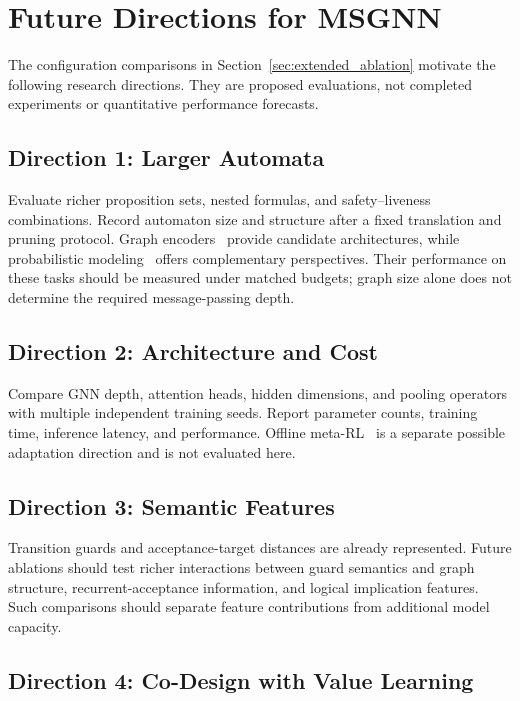 \documentclass[journal]{IEEEtran}
\begin{document}
\section{Future Directions for MSGNN}
\label{app:future_directions}

The configuration comparisons in Section~\ref{sec:extended_ablation} motivate the following research directions. They are proposed evaluations, not completed experiments or quantitative performance forecasts.

\subsection{Direction 1: Larger Automata}

Evaluate richer proposition sets, nested formulas, and safety--liveness combinations. Record automaton size and structure after a fixed translation and pruning protocol. Graph encoders~\citep{Kipf2017,wang2023graph} provide candidate architectures, while probabilistic modeling~\citep{murphy2018machine} offers complementary perspectives. Their performance on these tasks should be measured under matched budgets; graph size alone does not determine the required message-passing depth.

\subsection{Direction 2: Architecture and Cost}

Compare GNN depth, attention heads, hidden dimensions, and pooling operators with multiple independent training seeds. Report parameter counts, training time, inference latency, and performance. Offline meta-RL~\citep{pong2022offline} is a separate possible adaptation direction and is not evaluated here.

\subsection{Direction 3: Semantic Features}

Transition guards and acceptance-target distances are already represented. Future ablations should test richer interactions between guard semantics and graph structure, recurrent-acceptance information, and logical implication features. Such comparisons should separate feature contributions from additional model capacity.

\subsection{Direction 4: Co-Design with Value Learning}
\end{document}
